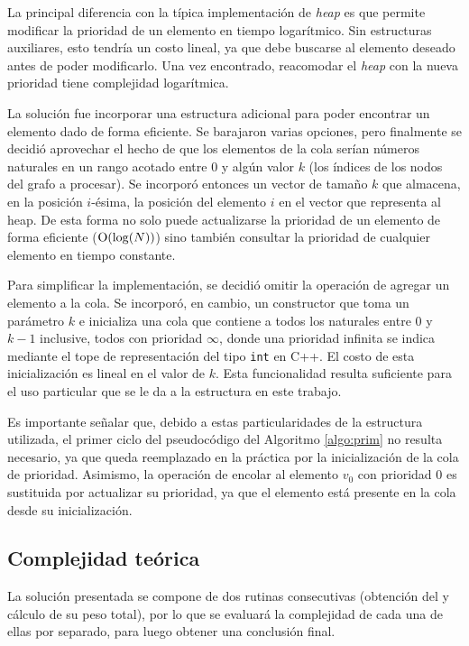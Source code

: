     La principal diferencia con la típica implementación de \emph{heap} es
    que permite modificar la prioridad de un elemento en tiempo
    logarítmico. Sin estructuras auxiliares, esto tendría un costo lineal, ya
    que debe buscarse al elemento deseado antes de poder modificarlo. Una vez
    encontrado, reacomodar el \emph{heap} con la nueva prioridad tiene
    complejidad logarítmica.

    La solución fue incorporar una estructura adicional para poder encontrar
    un elemento dado de forma eficiente. Se barajaron varias opciones, pero
    finalmente se decidió aprovechar el hecho de que los elementos de la cola
    serían números naturales en un rango acotado entre $0$ y algún valor $k$
    (los índices de los nodos del grafo a procesar). Se incorporó entonces un
    vector de tamaño $k$ que almacena, en la posición $i$-ésima, la posición
    del elemento $i$ en el vector que representa al heap. De esta forma no
    solo puede actualizarse la prioridad de un elemento de forma eficiente
    ($\operatorname{O}(\log(N))$) sino también consultar la prioridad de cualquier
    elemento en tiempo constante.

    Para simplificar la implementación, se decidió omitir la operación de
    agregar un elemento a la cola. Se incorporó, en cambio, un constructor que
    toma un parámetro $k$ e inicializa una cola que contiene a todos los
    naturales entre $0$ y $k-1$ inclusive, todos con prioridad $\infty$,
    donde una prioridad infinita se indica mediante el tope de representación
    del tipo \texttt{int} en C++. El costo de esta inicialización es lineal
    en el valor de $k$. Esta funcionalidad resulta suficiente para
    el uso particular que se le da a la estructura en este trabajo.

    Es importante señalar que, debido a estas particularidades de la
    estructura utilizada, el primer ciclo del pseudocódigo del Algoritmo
    \ref{algo:prim} no resulta necesario, ya que queda reemplazado en la
    práctica por la inicialización de la cola de prioridad. Asimismo, la
    operación de encolar al elemento $v_0$ con prioridad $0$ es sustituida
    por actualizar su prioridad, ya que el elemento está presente en la cola
    desde su inicialización.

    \subsection{Complejidad teórica}
    La solución presentada se compone de dos rutinas consecutivas (obtención
    del  y cálculo de su peso total), por lo que se evaluará la
    complejidad de cada una de ellas por separado, para luego obtener una
    conclusión final.

